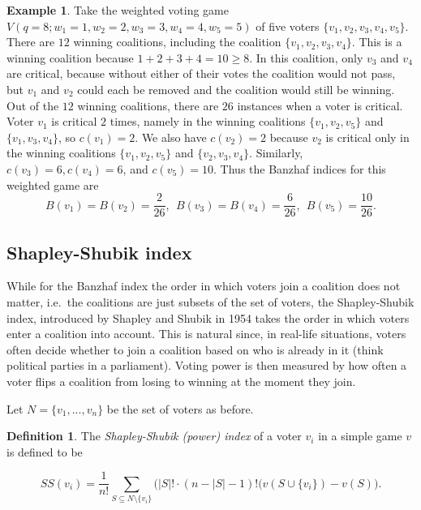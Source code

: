\documentclass[11pt]{amsart}
\theoremstyle{plain}
\theoremstyle{definition}
\newtheorem{defin}[thm]{Definition}
\newtheorem{example}[thm]{Example}
\theoremstyle{remark}
\begin{document}
\begin{example}\label{E:Banzhaf1}
Take the weighted voting game $V(q=8; w_1=1, w_2=2, w_3=3, w_4=4, w_5=5)$ of five voters $\{v_1, v_2, v_3, v_4, v_5\}$. There are $12$ winning coalitions, including the coalition $\{v_1, v_2, v_3, v_4\}$. This is a winning coalition because $1+2+3+4=10 \geq 8$. In this coalition, only $v_3$ and $v_4$ are critical, because without either of their votes the coalition would not pass, but $v_1$ and $v_2$ could each be removed and the coalition would still be winning. Out of the $12$ winning coalitions, there are $26$ instances when a voter is critical. Voter $v_1$ is critical $2$ times, namely in the winning coalitions $\{v_1, v_2, v_5\}$ and $\{v_1, v_3, v_4\}$, so $c(v_1)=2$. We also have $c(v_2)=2$ because $v_2$ is critical only in the winning coalitions $\{v_1, v_2, v_5\}$ and $\{v_2, v_3, v_4\}$. Similarly, $c(v_3)=6, c(v_4)=6$, and $c(v_5)=10$. Thus the Banzhaf indices for this weighted game are
$$B(v_1)=B(v_2)=\frac{2}{26},\ \  B(v_3)=B(v_4)=\frac{6}{26},\ \  B(v_5)=\frac{10}{26} .$$
\end{example}


\subsection{Shapley-Shubik index}\label{SS:ShSh}
While for the Banzhaf index the order in which voters join a coalition does not matter, i.e.~the coalitions are just subsets of the set of voters, the Shapley-Shubik index, introduced by Shapley and Shubik in 1954 \cite{ShSh54} takes the order in which voters enter a coalition into account. This is natural since, in real-life situations, voters often decide whether to join a coalition based on who is already in it (think political parties in a parliament). Voting power is then measured by how often a voter flips a coalition from losing to winning at the moment they join. 

Let $N=\{v_1, ..., v_n\}$ be the set of voters as before.

\begin{defin}
The \emph{Shapley-Shubik (power) index} of a voter $v_i$ in a simple game $v$  is defined to be 

\begin{equation}\label{E:SS}
SS(v_i)=\frac{1}{n!}\sum_{S\subseteq N\setminus \{v_i\}} (|S|!\cdot(n-|S|-1)!\big(v(S\cup \{v_i\}) - v(S)  \big).
\end{equation}


\end{defin}
\end{document}
